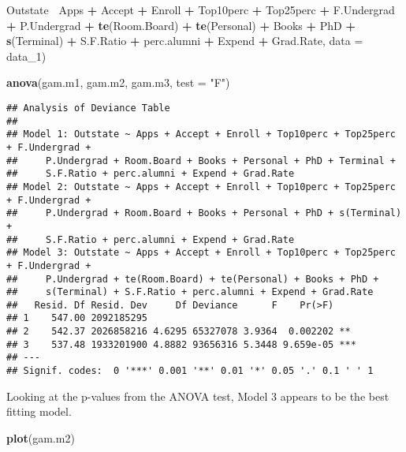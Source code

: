 \documentclass[]{article}
\newenvironment{Shaded}{\begin{snugshade}}{\end{snugshade}}
\newcommand{\DataTypeTok}[1]{\textcolor[rgb]{0.13,0.29,0.53}{#1}}
\newcommand{\DecValTok}[1]{\textcolor[rgb]{0.00,0.00,0.81}{#1}}
\newcommand{\KeywordTok}[1]{\textcolor[rgb]{0.13,0.29,0.53}{\textbf{#1}}}
\newcommand{\NormalTok}[1]{#1}
\newcommand{\OperatorTok}[1]{\textcolor[rgb]{0.81,0.36,0.00}{\textbf{#1}}}
\newcommand{\StringTok}[1]{\textcolor[rgb]{0.31,0.60,0.02}{#1}}
\begin{document}
\begin{Shaded}
\begin{Highlighting}[]
\NormalTok{  Outstate}\OperatorTok{~}\StringTok{ }\NormalTok{Apps }\OperatorTok{+}\StringTok{ }\NormalTok{Accept }\OperatorTok{+}\StringTok{ }\NormalTok{Enroll }\OperatorTok{+}\StringTok{ }\NormalTok{Top10perc }\OperatorTok{+}\StringTok{ }\NormalTok{Top25perc }\OperatorTok{+}\StringTok{ }\NormalTok{F.Undergrad }\OperatorTok{+}\StringTok{ }\NormalTok{P.Undergrad }\OperatorTok{+}\StringTok{ }\KeywordTok{te}\NormalTok{(Room.Board) }\OperatorTok{+}\StringTok{ }\KeywordTok{te}\NormalTok{(Personal) }\OperatorTok{+}\StringTok{ }\NormalTok{Books }\OperatorTok{+}\StringTok{ }\NormalTok{PhD }\OperatorTok{+}\StringTok{ }\KeywordTok{s}\NormalTok{(Terminal) }\OperatorTok{+}\StringTok{ }\NormalTok{S.F.Ratio }\OperatorTok{+}\StringTok{ }\NormalTok{perc.alumni }\OperatorTok{+}\StringTok{ }\NormalTok{Expend }\OperatorTok{+}\StringTok{ }\NormalTok{Grad.Rate, }\DataTypeTok{data =}\NormalTok{ data_}\DecValTok{1}\NormalTok{)}

\KeywordTok{anova}\NormalTok{(gam.m1, gam.m2, gam.m3, }\DataTypeTok{test =} \StringTok{"F"}\NormalTok{)}
\end{Highlighting}
\end{Shaded}

\begin{verbatim}
## Analysis of Deviance Table
## 
## Model 1: Outstate ~ Apps + Accept + Enroll + Top10perc + Top25perc + F.Undergrad + 
##     P.Undergrad + Room.Board + Books + Personal + PhD + Terminal + 
##     S.F.Ratio + perc.alumni + Expend + Grad.Rate
## Model 2: Outstate ~ Apps + Accept + Enroll + Top10perc + Top25perc + F.Undergrad + 
##     P.Undergrad + Room.Board + Books + Personal + PhD + s(Terminal) + 
##     S.F.Ratio + perc.alumni + Expend + Grad.Rate
## Model 3: Outstate ~ Apps + Accept + Enroll + Top10perc + Top25perc + F.Undergrad + 
##     P.Undergrad + te(Room.Board) + te(Personal) + Books + PhD + 
##     s(Terminal) + S.F.Ratio + perc.alumni + Expend + Grad.Rate
##   Resid. Df Resid. Dev     Df Deviance      F    Pr(>F)    
## 1    547.00 2092185295                                     
## 2    542.37 2026858216 4.6295 65327078 3.9364  0.002202 ** 
## 3    537.48 1933201900 4.8882 93656316 5.3448 9.659e-05 ***
## ---
## Signif. codes:  0 '***' 0.001 '**' 0.01 '*' 0.05 '.' 0.1 ' ' 1
\end{verbatim}

Looking at the p-values from the ANOVA test, Model 3 appears to be the
best fitting model.

\begin{Shaded}
\begin{Highlighting}[]
\KeywordTok{plot}\NormalTok{(gam.m2)}
\end{Highlighting}
\end{Shaded}
\end{document}
